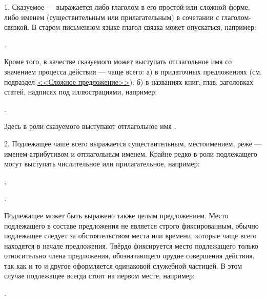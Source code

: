 1. Сказуемое --- выражается либо глаголом в его простой или сложной форме, либо именем (существительным или прилагательным) в сочетании с глаголом-связкой. В старом письменном языке глагол-связка может опускаться, например:
\begin{prfsample}
	\item {}.
\end{prfsample}
Кроме того, в качестве сказуемого может выступать отглагольное имя со значением процесса действия --- чаще всего: а) в придаточных предложениях (см. подраздел \hyperref[sec:sintaks:slozhn]{<<Сложное предложение>>}); б) в названиях книг, глав, заголовках статей, надписях
под иллюстрациями, например:
\begin{prfsample}
	\item {}.
\end{prfsample}
Здесь в роли сказуемого выступают отглагольное имя .

2. Подлежащее чаше всего выражается существительным, местоимением, реже --- именем-атрибутивом и отглагольным именем. Крайне редко в роли подлежащего могут выступать числительное или прилагательное, например:
\begin{prfsample}
	\item {};
	\item {}.
\end{prfsample}
Подлежащее может быть выражено также целым предложением. Место подлежащего в составе предложения не является строго фиксированным, обычно подлежащее следует за обстоятельством места или времени, которые чаще всего находятся в начале предложения. Твёрдо фиксируется место подлежащего только относительно члена предложения, обозначающего орудие совершения действия, так как и то и другое оформляется одинаковой служебной частицей. В этом случае подлежащее всегда стоит на первом месте, например:
\begin{prfsample}
	\item {}.
\end{prfsample}


